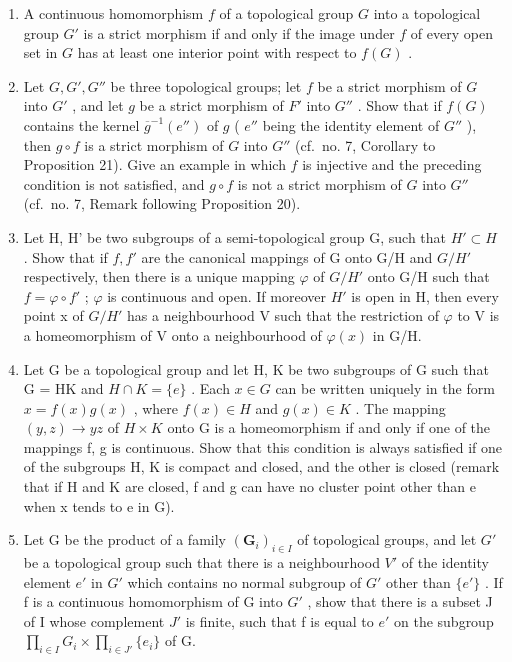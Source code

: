 \begin{enumerate}
\def\labelenumi{\arabic{enumi})}
\setcounter{enumi}{17}
\item
  A continuous homomorphism \(f\) of a topological group \(G\) into a topological group \(G'\) is a strict morphism if and only if the image under \(f\) of every open set in \(G\) has at least one interior point with respect to \(f(G)\) .
\item
  Let \(G, G', G''\) be three topological groups; let \(f\) be a strict morphism of \(G\) into \(G'\) , and let \(g\) be a strict morphism of \(F'\) into \(G''\) . Show that if \(f(G)\) contains the kernel \(\overline{g}^{-1}(e'')\) of \(g\) ( \(e''\) being the identity element of \(G''\) ), then \(g \circ f\) is a strict morphism of \(G\) into \(G''\) (cf.~no. 7, Corollary to Proposition 21). Give an example in which \(f\) is injective and the preceding condition is not satisfied, and \(g \circ f\) is not a strict morphism of \(G\) into \(G''\) (cf.~no. 7, Remark following Proposition 20).
\item
  Let H, H' be two subgroups of a semi-topological group G, such that \(H' \subset H\) . Show that if \(f, f'\) are the canonical mappings of G onto G/H and \(G/H'\) respectively, then there is a unique mapping \(\varphi\) of \(G/H'\) onto G/H such that \(f = \varphi \circ f'\) ; \(\varphi\) is continuous and open. If moreover \(H'\) is open in H, then every point x of \(G/H'\) has a neighbourhood V such that the restriction of \(\varphi\) to V is a homeomorphism of V onto a neighbourhood of \(\varphi(x)\) in G/H.
\item
  Let G be a topological group and let H, K be two subgroups of G such that G = HK and \(H \cap K = \{e\}\) . Each \(x \in G\) can be written uniquely in the form \(x = f(x)g(x)\) , where \(f(x) \in H\) and \(g(x) \in K\) . The mapping \((y, z) \to yz\) of \(H \times K\) onto G is a homeomorphism if and only if one of the mappings f, g is continuous. Show that this condition is always satisfied if one of the subgroups H, K is compact and closed, and the other is closed (remark that if H and K are closed, f and g can have no cluster point other than e when x tends to e in G).
\item
  Let G be the product of a family \((\mathbf{G}_{i})_{i\in I}\) of topological groups, and let \(G'\) be a topological group such that there is a neighbourhood \(V'\) of the identity element \(e'\) in \(G'\) which contains no normal subgroup of \(G'\) other than \(\{e'\}\) . If f is a continuous homomorphism of G into \(G'\) , show that there is a subset J of I whose complement \(J'\) is finite, such that f is equal to \(e'\) on the subgroup \(\prod_{i\in I}G_{i}\times\prod_{i\in J'}\{e_{i}\}\) of G.
\end{enumerate}

